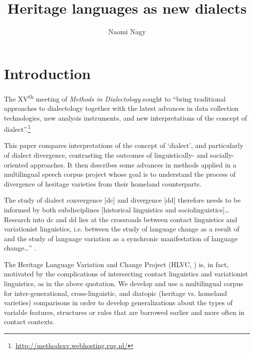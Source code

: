 \documentclass[output=paper]{LSP/langsci}
\author{Naomi Nagy\affiliation{University of Toronto, Department of Linguistics }}
\title{Heritage languages as new dialects}
\begin{document}

\section{Introduction}
The XV\textsuperscript{th} meeting of \textit{Methods in Dialectology} sought to “bring traditional approaches to dialectology together with the latest advances in data collection technologies, new analysis instruments, and new interpretations of the concept of dialect”.\footnote{\url{http://methodsxv.webhosting.rug.nl/}}

This paper compares interpretations of the concept of `dialect', and particularly of dialect divergence, contrasting the outcomes of linguistically- and socially-oriented approaches. It then describes some advances in methods applied in a multilingual speech corpus project whose goal is to understand the process of divergence of heritage varieties from their homeland counterparts.

The study of dialect convergence [dc] and divergence [dd] therefore needs to be informed by both subdisciplines [historical linguistics and sociolinguistics]… Research into dc and dd lies at the crossroads between contact linguistics and variationist linguistics, i.e. between the study of language change as a result of  and the study of language variation as a synchronic manifestation of language change…” \citep[16]{auer_study_2004}.

The Heritage Language Variation and Change Project (HLVC, \citealt{nagy_multilingual_2011}) is, in fact, motivated by the complications of intersecting contact linguistics and variationist linguistics, as in the above quotation. We develop and use a multilingual corpus for inter-generational, cross-linguistic, and diatopic (heritage vs. homeland varieties) comparisons in order to develop generalizations about the types of variable features, structures or rules that are borrowed earlier and more often in contact contexts.  
\end{document}
